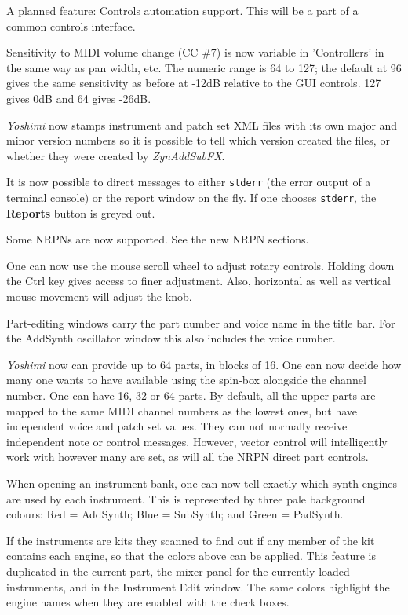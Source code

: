 \documentclass[
 11pt,
 twoside,
 a4paper,
 final                                 %
]{article}
\begin{document}
   A planned feature:
   Controls automation support.
   This will be a part of a common controls interface.

   Sensitivity to MIDI volume change (CC \#7) is now variable in 'Controllers' in
   the same way as pan width, etc. The numeric range is 64 to 127; the default
   at 96 gives the same sensitivity as before at -12dB relative to the GUI
   controls.  127 gives 0dB and 64 gives -26dB.

   \textsl{Yoshimi} now stamps instrument and patch set XML files with its own
   major and minor version numbers so it is possible to tell which version
   created the files, or whether they were created by \textsl{ZynAddSubFX}.

   It is now possible to direct messages to either \texttt{stderr}
   (the error output of a terminal console) or the report window
   on the fly. If one chooses \texttt{stderr}, the \textbf{Reports} button is
   greyed out.

   Some NRPNs are now supported.
   See the new NRPN sections.

   One can now use the mouse scroll wheel to adjust rotary controls. Holding
   down the Ctrl key gives access to finer adjustment.  Also, horizontal as
   well as vertical mouse movement will adjust the knob.

   Part-editing windows carry the part number and voice name in the title bar.
   For the AddSynth oscillator window this also includes the voice number.

   \textsl{Yoshimi} now can provide  up to 64 parts, in blocks of 16. One can
   now decide how many one wants to have available using the spin-box alongside
   the channel number.  One can have 16, 32 or 64 parts.  By default, all the
   upper parts are mapped to the same MIDI channel numbers as the lowest ones,
   but have independent voice and patch set values. They can not normally
   receive independent note or control messages. However, vector control will
   intelligently work with however many are set, as will all the NRPN direct
   part controls.

   When opening an instrument bank, one can now tell exactly which synth
   engines are used by each instrument. This is represented by three pale
   background colours: Red = AddSynth; Blue = SubSynth; and Green = PadSynth.

   If the instruments are kits they scanned to find out if any member of the
   kit contains each engine, so that the colors above can be applied.
   This feature is duplicated in the current part, the mixer panel for the
   currently loaded instruments, and in the Instrument Edit window.
   The same colors highlight the engine names when they are enabled with the
   check boxes. 
\end{document}
